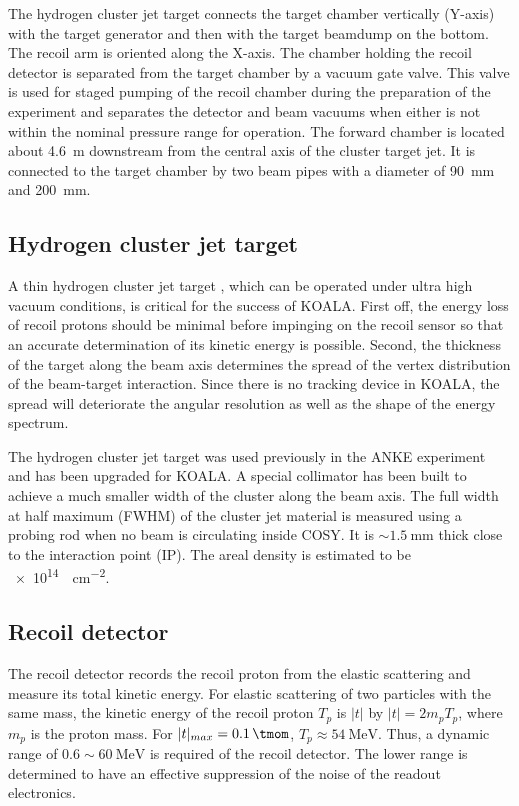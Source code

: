 \documentclass[number,5p]{elsarticle}
\begin{document}
The hydrogen cluster jet target connects the target chamber vertically (Y-axis) with
the target generator and then with the target beamdump on the bottom.
The recoil arm is oriented along the X-axis.
The chamber holding the recoil detector is separated from the target
chamber by a vacuum gate valve.
This valve is used for staged pumping of the recoil chamber during the
preparation of the experiment and separates the detector and beam vacuums when
either is not within the nominal pressure range for operation.
The forward chamber is located about \SI{4.6}{\meter} downstream from the
central axis of the cluster target jet.
It is connected to the target chamber by two beam pipes with a diameter of \SI{90}{\mm} and \SI{200}{\mm}. 

\subsection{Hydrogen cluster jet target}
\label{sec:target}

A thin hydrogen cluster jet target \cite{cluster_target}, which can be operated under ultra high vacuum conditions, is critical for the success of KOALA.
First off, the energy loss of recoil protons should be minimal before impinging
on the recoil sensor so that an accurate determination of its kinetic energy is possible.
Second, the thickness of the target along the beam axis determines
the spread of the vertex distribution of the beam-target interaction.
Since there is no tracking device in KOALA, the spread will deteriorate the
angular resolution as well as the shape of the energy spectrum.

The hydrogen cluster jet target was used previously in the ANKE experiment
\cite{ANKE} and has been upgraded for KOALA.
A special collimator has been built to achieve a much
smaller width of the cluster along the beam axis.
The full width at half maximum (FWHM) of the cluster jet material is measured
using a probing rod when no beam is circulating inside COSY.
It is $\sim\SI{1.5}{\mm}$ thick close to the interaction point (IP).
The areal density is estimated to be \SI{e14}{\atom\per\cm\squared}.

\subsection{Recoil detector}
\label{sec:recoil}

The recoil detector records the recoil proton from the
elastic scattering and measure its total kinetic energy.
For elastic scattering of two particles with the same mass,
the kinetic energy of the recoil proton \(T_p\) is $|t|$ by \(|t| = 2m_pT_p\), where \(m_p\) is the proton mass.
For $|t|_{max}=\SI{0.1}{\tmom}$, \(T_p \approx \SI{54}{\MeV}\). Thus, a dynamic range of
$0.6\sim\SI{60}{\MeV}$ is required of the recoil detector.
The lower range is determined to have an effective suppression of the noise of the
readout electronics.
\end{document}
